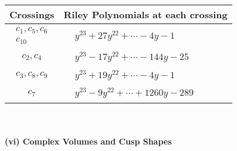 \documentclass[1p]{elsarticle_modified}
\theoremstyle{definition}
\begin{document}
\begin{tabular}{m{50pt}|m{274pt}}
Crossings & \hspace{64pt}Riley Polynomials at each crossing \\
\hline $$\begin{aligned}c_{1},c_{5},c_{6}\\c_{10}\end{aligned}$$&$\begin{aligned}
&y^{23}+27 y^{22}+\cdots-4 y-1
\end{aligned}$\\
\hline $$\begin{aligned}c_{2},c_{4}\end{aligned}$$&$\begin{aligned}
&y^{23}-17 y^{22}+\cdots-144 y-25
\end{aligned}$\\
\hline $$\begin{aligned}c_{3},c_{8},c_{9}\end{aligned}$$&$\begin{aligned}
&y^{23}+19 y^{22}+\cdots-4 y-1
\end{aligned}$\\
\hline $$\begin{aligned}c_{7}\end{aligned}$$&$\begin{aligned}
&y^{23}-9 y^{22}+\cdots+1260 y-289
\end{aligned}$\\
\hline
\end{tabular}\\~\\
\newpage\flushleft \textbf{(vi) Complex Volumes and Cusp Shapes}
\end{document}

